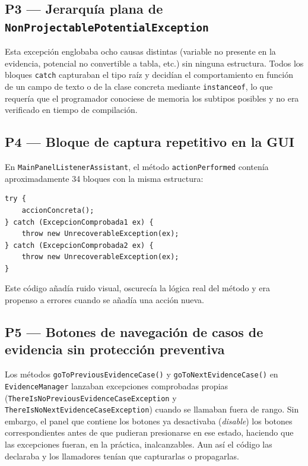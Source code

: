\documentclass[12pt,a4paper]{article}
\begin{document}
\subsection{P3 — Jerarquía plana de \texttt{NonProjectablePotentialException}}

Esta excepción englobaba ocho causas distintas (variable no presente en la
evidencia, potencial no convertible a tabla, etc.) sin ninguna estructura. Todos
los bloques \texttt{catch} capturaban el tipo raíz y decidían el comportamiento
en función de un campo de texto o de la clase concreta mediante
\texttt{instanceof}, lo que requería que el programador conociese de memoria los
subtipos posibles y no era verificado en tiempo de compilación.

\subsection{P4 — Bloque de captura repetitivo en la GUI}

En \texttt{MainPanelListenerAssistant}, el método \texttt{actionPerformed}
contenía aproximadamente 34 bloques con la misma estructura:

\begin{lstlisting}[caption={Patrón repetitivo antes de la refactorización}]
try {
    accionConcreta();
} catch (ExcepcionComprobada1 ex) {
    throw new UnrecoverableException(ex);
} catch (ExcepcionComprobada2 ex) {
    throw new UnrecoverableException(ex);
}
\end{lstlisting}

Este código añadía ruido visual, oscurecía la lógica real del método y era
propenso a errores cuando se añadía una acción nueva.

\subsection{P5 — Botones de navegación de casos de evidencia sin protección preventiva}

Los métodos \texttt{goToPreviousEvidenceCase()} y \texttt{goToNextEvidenceCase()}
en \texttt{EvidenceManager} lanzaban excepciones comprobadas propias
(\texttt{ThereIsNoPreviousEvidenceCaseException} y
\texttt{ThereIsNoNextEvidenceCaseException}) cuando se llamaban fuera de rango.
Sin embargo, el panel que contiene los botones ya desactivaba (\textit{disable})
los botones correspondientes antes de que pudieran presionarse en ese estado,
haciendo que las excepciones fueran, en la práctica, inalcanzables. Aun así el
código las declaraba y los llamadores tenían que capturarlas o propagarlas.
\end{document}
